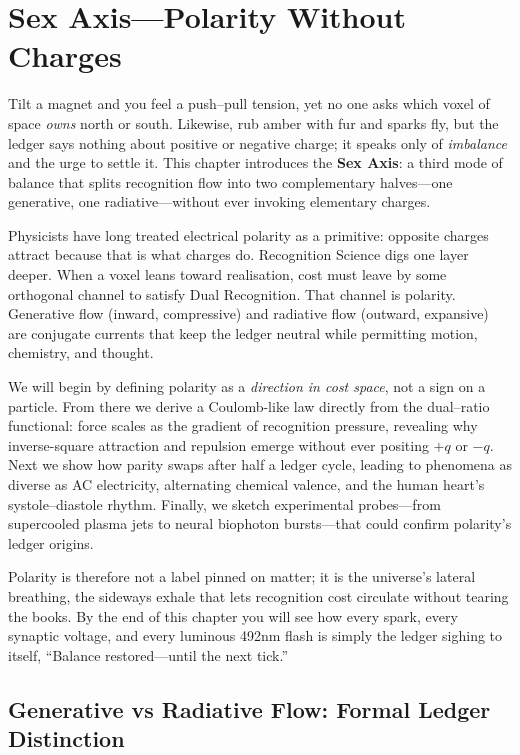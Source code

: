 \documentclass[11pt,oneside]{book}
\begin{document}
\chapter{Sex Axis—Polarity Without Charges}
\label{chap:sex-axis}

Tilt a magnet and you feel a push–pull tension, yet no one asks which voxel of space \emph{owns} north or south.  
Likewise, rub amber with fur and sparks fly, but the ledger says nothing about positive or negative charge; it speaks only of \emph{imbalance} and the urge to settle it.  
This chapter introduces the \textbf{Sex Axis}: a third mode of balance that splits recognition flow into two complementary halves—one generative, one radiative—without ever invoking elementary charges.

Physicists have long treated electrical polarity as a primitive: opposite charges attract because that is what charges do.  
Recognition Science digs one layer deeper.  
When a voxel leans toward realisation, cost must leave by some orthogonal channel to satisfy Dual Recognition.  
That channel is polarity.  
Generative flow (inward, compressive) and radiative flow (outward, expansive) are conjugate currents that keep the ledger neutral while permitting motion, chemistry, and thought.

We will begin by defining polarity as a \emph{direction in cost space}, not a sign on a particle.  
From there we derive a Coulomb-like law directly from the dual–ratio functional: force scales as the gradient of recognition pressure, revealing why inverse-square attraction and repulsion emerge without ever positing $+q$ or $-q$.  
Next we show how parity swaps after half a ledger cycle, leading to phenomena as diverse as AC electricity, alternating chemical valence, and the human heart’s systole–diastole rhythm.  
Finally, we sketch experimental probes—from supercooled plasma jets to neural biophoton bursts—that could confirm polarity’s ledger origins.

Polarity is therefore not a label pinned on matter; it is the universe’s lateral breathing, the sideways exhale that lets recognition cost circulate without tearing the books.  
By the end of this chapter you will see how every spark, every synaptic voltage, and every luminous 492nm flash is simply the ledger sighing to itself, “Balance restored—until the next tick.”

\section{Generative vs Radiative Flow: Formal Ledger Distinction}
\label{sec:generative-radiative}
\end{document}

